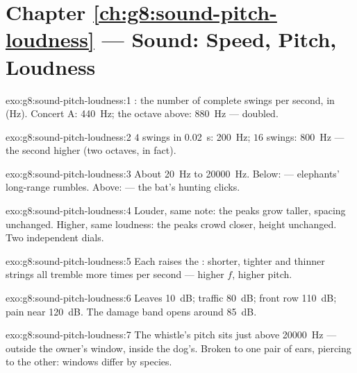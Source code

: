 \section*{Chapter \ref{ch:g8:sound-pitch-loudness} --- Sound: Speed, Pitch, Loudness}

\begin{solution}{exo:g8:sound-pitch-loudness:1}
: the number of complete swings per second, in 
(\unit{Hz}). Concert A: \qty{440}{Hz}; the octave above:
\qty{880}{Hz} --- doubled.
\end{solution}

\begin{solution}{exo:g8:sound-pitch-loudness:2}
$4$ swings in \qty{0.02}{s}: \qty{200}{Hz}; $16$ swings:
\qty{800}{Hz} --- the second  higher (two octaves, in
fact).
\end{solution}

\begin{solution}{exo:g8:sound-pitch-loudness:3}
About \qty{20}{Hz} to \qty{20000}{Hz}. Below:  ---
elephants' long-range rumbles. Above:  --- the bat's
hunting clicks.
\end{solution}

\begin{solution}{exo:g8:sound-pitch-loudness:4}
Louder, same note: the peaks grow taller, spacing unchanged.
Higher, same loudness: the peaks crowd closer, height
unchanged. Two independent dials.
\end{solution}

\begin{solution}{exo:g8:sound-pitch-loudness:5}
Each raises the : shorter, tighter and thinner
strings all tremble more times per second --- higher $f$,
higher pitch.
\end{solution}

\begin{solution}{exo:g8:sound-pitch-loudness:6}
Leaves \qty{10}{dB}; traffic \qty{80}{dB}; front row
\qty{110}{dB}; pain near \qty{120}{dB}. The damage band opens
around \qty{85}{dB}.
\end{solution}

\begin{solution}{exo:g8:sound-pitch-loudness:7}
The whistle's pitch sits just above \qty{20000}{Hz} ---
outside the owner's window, inside the dog's. Broken to one
pair of ears, piercing to the other: windows differ by
species.
\end{solution}

